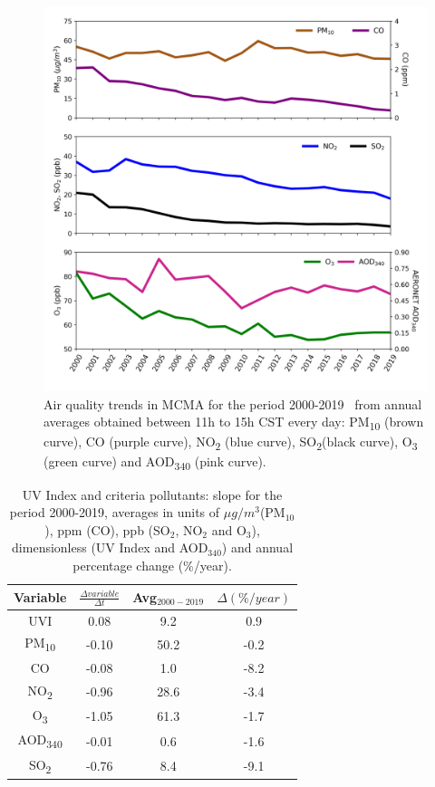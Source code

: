 \documentclass[journal=jacsat,manuscript=article]{achemso}
\begin{document}
\begin{figure}[H]
  \begin{center}
    \includegraphics[width=0.63\columnwidth]{figures/pollutants}
    \caption{{Air quality trends in MCMA for the period 2000-2019~ from annual
    averages obtained between 11h to 15h CST every day: PM\textsubscript{10}
    (brown curve), CO (purple curve), NO\textsubscript{2} (blue curve),
    SO\textsubscript{2}(black curve), O\textsubscript{3} (green curve) and
    AOD\textsubscript{340} (pink curve).
    {\label{829996}}%
    }}
  \end{center}
\end{figure}

\begin{table}[H]
  \centering
  \begin{tabular}{cccc} \hline
    Variable               & $\frac{\Delta variable}{\Delta t}$ & Avg$_{2000-2019}$ & $\Delta(\%/year)$ \\ \hline
    UVI                    & 0.08                               & 9.2               & 0.9               \\
    PM\textsubscript{10}   & -0.10                              & 50.2              & -0.2              \\
    CO                     & -0.08                              & 1.0               & -8.2              \\
    NO\textsubscript{2}    & -0.96                              & 28.6              & -3.4              \\
    O\textsubscript{3}     & -1.05                              & 61.3              & -1.7              \\
    AOD\textsubscript{340} & -0.01                              & 0.6               & -1.6              \\
    SO\textsubscript{2}    & -0.76                              & 8.4               & -9.1              \\
    \hline
  \end{tabular}
  \caption{{{{UV Index and criteria pollutants: slope for the period 2000-2019,
                averages in units of $\mu g/m^3$(PM$_{10}$), ppm (CO), ppb
                (SO$_2$, NO$_2$ and O$_3$), dimensionless (UV Index and AOD$_{340}$) and
                annual percentage change (\%/year).}}}}
  \label{table:uvindex}
\end{table}
\end{document}
